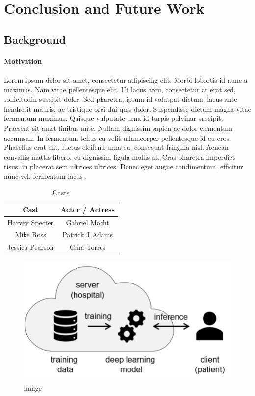 \chapter{Conclusion and Future Work} \label{chapter:conclusion_and_future_work}

\section{Background}

\subsubsection{Motivation}

Lorem ipsum dolor sit amet, consectetur adipiscing elit. Morbi lobortis id nunc a maximus. Nam vitae pellentesque elit. Ut lacus arcu, consectetur at erat sed, sollicitudin suscipit dolor. Sed pharetra, ipsum id volutpat dictum, lacus ante hendrerit mauris, ac tristique orci dui quis dolor. Suspendisse dictum magna vitae fermentum maximus. Quisque vulputate urna id turpis pulvinar suscipit. Praesent sit amet finibus ante. Nullam dignissim sapien ac dolor elementum accumsan. In fermentum tellus eu velit ullamcorper pellentesque id eu eros. Phasellus erat elit, luctus eleifend urna eu, consequat fringilla nisl. Aenean convallis mattis libero, eu dignissim ligula mollis at. Cras pharetra imperdiet risus, in placerat sem ultrices ultrices. Donec eget augue condimentum, efficitur nunc vel, fermentum lacus .

\begin{table}[!ht]
    \centering
    \begin{tabular}{@{}cc@{}}
    \toprule
    Cast            & Actor / Actress \\ \midrule
    Harvey Specter  & Gabriel Macht   \\
    Mike Ross       & Patrick J Adams \\
    Jessica Pearson & Gina Torres     \\ \bottomrule
    \end{tabular}
    \caption{Casts}
\end{table}

\begin{figure}[!ht]
    \centering
    \includegraphics{figures/diag.png}
    \caption{Image}
\end{figure}

